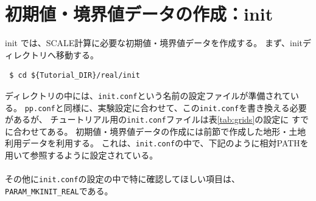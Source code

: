 
\section{初期値・境界値データの作成：init}

init では、SCALE計算に必要な初期値・境界値データを作成する。
まず、initディレクトリへ移動する。
\begin{verbatim}
 $ cd ${Tutorial_DIR}/real/init
\end{verbatim}
ディレクトリの中には、\verb|init.conf|という名前の設定ファイルが準備されている。
\verb|pp.conf|と同様に、実験設定に合わせて、この\verb|init.conf|を書き換える必要があるが、
チュートリアル用の\verb|init.conf|ファイルは表\ref{tab:grids}の設定に
すでに合わせてある。
初期値・境界値データの作成には前節で作成した地形・土地利用データを利用する。
これは、\verb|init.conf|の中で、下記のように相対PATHを用いて参照するように設定されている。\\

\\

\noindent その他に\verb|init.conf|の設定の中で特に確認してほしい項目は、
\verb|PARAM_MKINIT_REAL|である。\\

